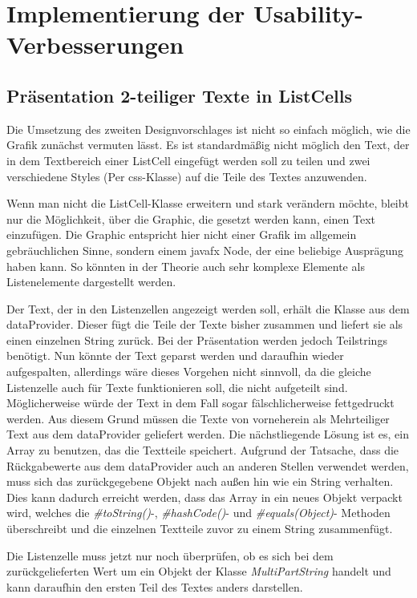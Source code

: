 \chapter{Implementierung der Usability-Verbesserungen}
\section{Präsentation 2-teiliger Texte in ListCells} \label{sec:verbListCell}
Die Umsetzung des zweiten Designvorschlages ist nicht so einfach möglich, wie die Grafik zunächst vermuten lässt. Es ist standardmäßig nicht möglich den Text, der in dem Textbereich einer ListCell eingefügt werden soll zu teilen und zwei verschiedene Styles (Per \gls{css}-Klasse) auf die Teile des Textes anzuwenden.

Wenn man nicht die ListCell-Klasse erweitern und stark verändern möchte, bleibt nur die Möglichkeit, über die Graphic, die gesetzt werden kann, einen Text einzufügen. Die Graphic entspricht hier nicht einer Grafik im allgemein gebräuchlichen Sinne, sondern einem \gls{javafx} Node, der eine beliebige Ausprägung haben kann. So könnten in der Theorie auch sehr komplexe Elemente als Listenelemente dargestellt werden.

Der Text, der in den Listenzellen angezeigt werden soll, erhält die Klasse aus dem \gls{dataProvider}. Dieser fügt die Teile der Texte bisher zusammen und liefert sie als einen einzelnen String zurück. Bei der Präsentation werden jedoch Teilstrings benötigt. Nun könnte der Text geparst werden und daraufhin wieder aufgespalten, allerdings wäre dieses Vorgehen nicht sinnvoll, da die gleiche Listenzelle auch für Texte funktionieren soll, die nicht aufgeteilt sind. Möglicherweise würde der Text in dem Fall sogar fälschlicherweise fettgedruckt werden. Aus diesem Grund müssen die Texte von vorneherein als Mehrteiliger Text aus dem \gls{dataProvider} geliefert werden. Die nächstliegende Lösung ist es, ein Array zu benutzen, das die Textteile speichert. Aufgrund der Tatsache, dass die Rückgabewerte aus dem \gls{dataProvider} auch an anderen Stellen verwendet werden, muss sich das zurückgegebene Objekt nach außen hin wie ein String verhalten. Dies kann dadurch erreicht werden, dass das Array in ein neues Objekt verpackt wird, welches die \textit{\#toString()}-, \textit{\#hashCode()}- und \textit{\#equals(Object)}- Methoden überschreibt und die einzelnen Textteile zuvor zu einem String zusammenfügt.

Die Listenzelle muss jetzt nur noch überprüfen, ob es sich bei dem zurückgelieferten Wert um ein Objekt der Klasse \textit{MultiPartString} handelt und kann daraufhin den ersten Teil des Textes anders darstellen.

